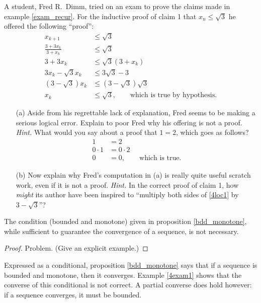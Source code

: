 \begin{prob} A student, Fred R.\ Dimm, tried on an exam to prove the claims made in
example \ref{exam_recur}.  For the inductive proof of claim 1 that $x_n \le \sqrt3$ he
offered the following ``proof'':
 \begin{align*}
                  x_{k+1} &\le \sqrt3 \\
     \frac{3+3x_k}{3+x_k} &\le \sqrt3 \\
                   3+3x_k &\le \sqrt3(3+x_k) \\
         3x_k - \sqrt3x_k &\le 3\sqrt3 - 3 \\
            (3-\sqrt3)x_k &\le (3-\sqrt3)\sqrt3 \\
                      x_k &\le \sqrt3, \qquad\text{which is true by hypothesis.}
 \end{align*}
 \begin{enumerate}
  \item[(a)] Aside from his regrettable lack of explanation, Fred seems to be making a
serious logical error.  Explain to poor Fred why his offering is not a proof.
\emph{Hint.}  What would you say about a proof that $1=2$, which goes as follows?
   \begin{align*}
                    1 &= 2 \\
            0 \cdot 1 &= 0 \cdot 2 \\
                    0 &= 0, \qquad\text{which is true.}
   \end{align*}
  \item[(b)] Now explain why Fred's computation in (a) is really quite useful scratch
work, even if it is not a proof.  \emph{Hint.} In the correct proof of claim 1, how
\emph{might} its author have been inspired to ``multiply both sides of \ref{4loc1} by $3
- \sqrt3$''?
 \end{enumerate}
\end{prob}

\begin{exam}\label{4exam1} The condition (bounded and monotone) given in proposition
\ref{bdd_monotone}, while sufficient to guarantee the convergence of a sequence, is not
necessary.
\end{exam}

\begin{proof} Problem.  (Give an explicit example.) \ns
\end{proof}

Expressed as a conditional, proposition \ref{bdd_monotone} says that if a sequence is bounded
and monotone, then it converges. Example \ref{4exam1} shows that the converse of this
conditional is not correct.  A partial converse does hold however: if a sequence converges, it
must be bounded.

